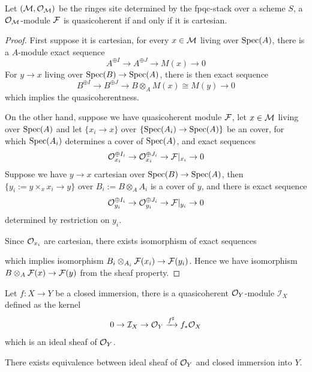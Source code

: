\begin{proposition}
Let $(\mathcal{M}, \mathcal{O}_{\mathcal{M}})$ be the ringes site determined by the fpqc-stack over a scheme $S$, a $\mathcal{O}_{\mathcal{M}}$-module $\mathcal{F}$ is quasicoherent if and only if it is cartesian.

\end{proposition}
\begin{proof}
    First suppose it is cartesian, for every $x\in \mathcal{M}$ living over $\operatorname{\mathrm{Spec}}(A)$, there is a $A$-module exact sequence
    \[
    A^{\oplus I}\to A^{\oplus J}\to M(x)\to 0
    \]
    For $y\to x$ living over $\operatorname{\mathrm{Spec}}(B)\to \operatorname{\mathrm{Spec}}(A)$, there is then exact sequence
    \[
    B^{\oplus I}\to B^{\oplus J}\to B\otimes_AM(x)\cong M(y)\to 0
    \]
    which implies the quasicoherentness.

    On the other hand, suppose we have quasicoherent module $\mathcal{F}$, let $x \in \mathcal{M}$ living over $\operatorname{\mathrm{Spec}}(A)$ and let $\{x_i\to x\}$ over $\{\operatorname{\mathrm{Spec}}(A_i)\to \operatorname{\mathrm{Spec}}(A)\}$ be an cover, for which $\operatorname{\mathrm{Spec}}(A_i)$ determines a cover of $\operatorname{\mathrm{Spec}}(A)$, and exact sequences
    \[
     \mathcal{O}_{x_i}^{\oplus I_i}\to \mathcal{O}_{x_i}^{\oplus J_i}\to \mathcal{F}|_{x_i}\to 0
    \]
    Suppose we have $y\to x$ cartesian over $\operatorname{\mathrm{Spec}}(B)\to \operatorname{\mathrm{Spec}}(A)$, then $\{y_i:=y\times_{x}x_i\to y\}$ over $B_i:=B\otimes_A A_i$ is a cover of $y$, and there is exact sequence
    \[
     \mathcal{O}_{y_i}^{\oplus I_i}\to \mathcal{O}_{y_i}^{\oplus J_i}\to \mathcal{F}|_{y_i}\to 0
    \]determined by restriction on $y_i$.

    Since $\mathcal{O}_{x_i}$ are cartesian, there exists isomorphism of exact sequences
   \begin{center}


\end{center}which implies isomorphism $ B_i\otimes_{A_i}\mathcal{F}(x_i)\to \mathcal{F}(y_i)$. Hence we have isomorphism $B\otimes_{A}\mathcal{F}(x)\to \mathcal{F}(y)$ from the sheaf property.
\end{proof}

\begin{definition}
    Let $f: X\to Y$ be a closed immersion, there is a quasicoherent $\mathcal{O}_Y$-module $\mathcal{I}_X$ defined as the kernel 
    \[
    0\to  \mathcal{I}_X\to \mathcal{O}_Y \xrightarrow{f^{\operatorname{\sharp}}} f_*\mathcal{O}_X
    \]which is an ideal sheaf of $\mathcal{O}_Y$.
\end{definition}
\begin{proposition}
    There exists equivalence between ideal sheaf of $\mathcal{O}_Y$ and closed immersion into $Y$.
\end{proposition}

